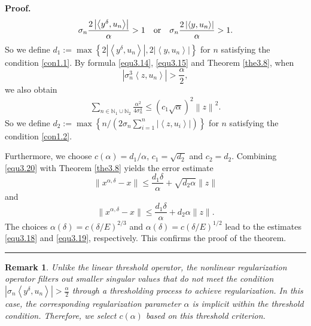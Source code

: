 \documentclass[a4paper,12pt]{article}
\newtheorem{remark}[theorem]{Remark}
\numberwithin{equation}{section}
\newenvironment{proof}[1][Proof]{\textbf{#1.} }
{\ \rule{0.75em}{0.75em}\smallskip}
\begin{document}
\begin{proof}
\begin{equation*}
        \sigma_{n}\frac{2\left|\left<y^{\delta},u_{n}\right>\right|}{\alpha}> 1\quad {\rm or} \quad \sigma_{n}\frac{2\left|\left<y,u_{n}\right>\right|}{\alpha}> 1.
     \end{equation*}
    So we define $d_{1}:=\max\left\{2\left|\left<y^{\delta},u_{n}\right>\right|, 2\left|\left<y,u_{n}\right>\right|\right\}$ for $n$ satisfying the condition \ref{con1.1}. By formula \eqref{equ3.14}, \eqref{equ3.15} and Theorem \ref{the3.8}, when
    \begin{equation}\label{con1.2}
        \left|\sigma_{n}^{3}\left<z, u_{n}\right>\right|>\frac{\alpha}{2},
    \end{equation}
    we also obtain
    \begin{align*}
        \sum_{n\in\mathbb{N}_{1}\cup\mathbb{N}_{2}}\frac{\alpha^{2}}{4\sigma_{n}^{4}}
        \leq \left(c_{1}\sqrt{\alpha}\right)^{2}\left\|z\right\|^{2}.
    \end{align*} 
    So we define $d_{2}:=\max\left\{n/\left(2\sigma_{n}\sum_{i=1}^{n}\left|\left<z,u_{i}\right>\right|\right) \right\}$ for $n$ satisfying the condition \ref{con1.2}. 
    \par Furthermore, we choose $c(\alpha)=d_{1}/\alpha$, $c_{1}=\sqrt{d_{2}}$ and $c_{2}=d_{2}$.
    Combining \eqref{equ3.20} with Theorem \ref{the3.8} yields the error estimate
    \begin{equation*}
        \|x^{\alpha,\delta}-x\|\leq\frac{d_{1}\delta}{\alpha}+\sqrt{d_{2}\alpha}\|z\|
    \end{equation*}
    and
    \begin{equation*}
        \|x^{\alpha,\delta}-x\|\leq\frac{d_{1}\delta}{\alpha}+d_{2}\alpha\|z\|.
    \end{equation*}
    The choices $\alpha(\delta)=c\left(\delta/E\right)^{2/3}$ and $\alpha(\delta)=c\left(\delta/E\right)^{1/2}$ lead to the estimates \eqref{equ3.18} and \eqref{equ3.19}, respectively. This confirms the proof of the theorem.
\end{proof}

\begin{remark}
    Unlike the linear threshold operator, the nonlinear regularization operator filters out smaller singular values that do not meet the condition $\left|\sigma_{n}\left<y^{\delta}, u_{n}\right>\right|>\frac{\alpha}{2}$ through a thresholding process to achieve regularization. In this case, the corresponding regularization parameter $\alpha$ is implicit within the threshold condition. Therefore, we select $c\left(\alpha\right)$ based on this threshold criterion.
\end{remark}
\end{document}

